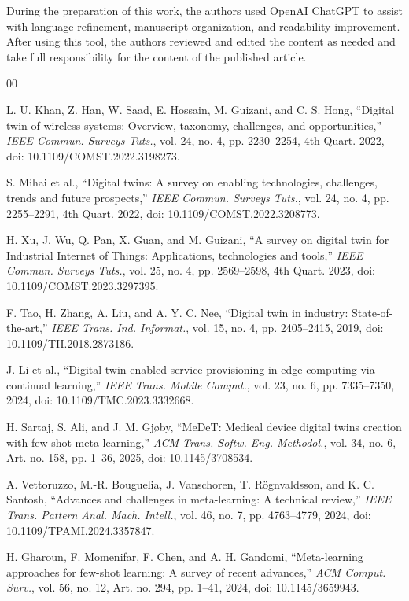 \documentclass[a4paper,fleqn]{cas-sc}
\begin{document}
During the preparation of this work, the authors used OpenAI ChatGPT to
assist with language refinement, manuscript organization, and readability
improvement. After using this tool, the authors reviewed and edited the
content as needed and take full responsibility for the content of the
published article.

\begin{thebibliography}{00}

 L. U. Khan, Z. Han, W. Saad, E. Hossain, M. Guizani, and C. S. Hong, ``Digital twin of wireless systems: Overview, taxonomy, challenges, and opportunities,'' \emph{IEEE Commun. Surveys Tuts.}, vol. 24, no. 4, pp. 2230--2254, 4th Quart. 2022, doi: 10.1109/COMST.2022.3198273.

 S. Mihai et al., ``Digital twins: A survey on enabling technologies, challenges, trends and future prospects,'' \emph{IEEE Commun. Surveys Tuts.}, vol. 24, no. 4, pp. 2255--2291, 4th Quart. 2022, doi: 10.1109/COMST.2022.3208773.

 H. Xu, J. Wu, Q. Pan, X. Guan, and M. Guizani, ``A survey on digital twin for Industrial Internet of Things: Applications, technologies and tools,'' \emph{IEEE Commun. Surveys Tuts.}, vol. 25, no. 4, pp. 2569--2598, 4th Quart. 2023, doi: 10.1109/COMST.2023.3297395.

 F. Tao, H. Zhang, A. Liu, and A. Y. C. Nee, ``Digital twin in industry: State-of-the-art,'' \emph{IEEE Trans. Ind. Informat.}, vol. 15, no. 4, pp. 2405--2415, 2019, doi: 10.1109/TII.2018.2873186.

 J. Li et al., ``Digital twin-enabled service provisioning in edge computing via continual learning,'' \emph{IEEE Trans. Mobile Comput.}, vol. 23, no. 6, pp. 7335--7350, 2024, doi: 10.1109/TMC.2023.3332668.

 H. Sartaj, S. Ali, and J. M. Gj{\o}by, ``MeDeT: Medical device digital twins creation with few-shot meta-learning,'' \emph{ACM Trans. Softw. Eng. Methodol.}, vol. 34, no. 6, Art. no. 158, pp. 1--36, 2025, doi: 10.1145/3708534.

 A. Vettoruzzo, M.-R. Bouguelia, J. Vanschoren, T. R{\"o}gnvaldsson, and K. C. Santosh, ``Advances and challenges in meta-learning: A technical review,'' \emph{IEEE Trans. Pattern Anal. Mach. Intell.}, vol. 46, no. 7, pp. 4763--4779, 2024, doi: 10.1109/TPAMI.2024.3357847.

 H. Gharoun, F. Momenifar, F. Chen, and A. H. Gandomi, ``Meta-learning approaches for few-shot learning: A survey of recent advances,'' \emph{ACM Comput. Surv.}, vol. 56, no. 12, Art. no. 294, pp. 1--41, 2024, doi: 10.1145/3659943.


\end{thebibliography}
\end{document}
